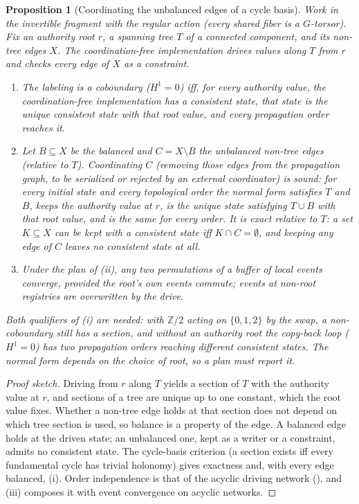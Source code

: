 \documentclass[11pt,a4paper]{article}
\theoremstyle{plain}
\newtheorem{proposition}[theorem]{Proposition}
\theoremstyle{definition}
\theoremstyle{remark}
\newcommand{\Ho}{H^1}
\renewcommand{\_}{\origunderscore\allowbreak}
\begin{document}
\begin{proposition}[Coordinating the unbalanced edges of a cycle basis]
\label{prop:minimal}
Work in the invertible fragment with the regular action (every shared fiber is a $G$-torsor). Fix an
authority root $r$, a spanning tree $T$ of a connected component, and its non-tree edges $X$. The
\emph{coordination-free implementation} drives values along $T$ from $r$ and checks every edge of $X$
as a constraint.
\begin{enumerate}[label=(\roman*)]
\item The labeling is a coboundary ($\Ho = 0$) iff, for every authority value, the coordination-free
  implementation has a consistent state, that state is the unique consistent state with that root
  value, and every propagation order reaches it.
\item Let $B \subseteq X$ be the balanced and $C = X \setminus B$ the unbalanced non-tree edges
  (relative to $T$). Coordinating $C$ (removing those edges from the propagation graph, to be
  serialized or rejected by an external coordinator) is sound: for every initial state and every
  topological order the normal form satisfies $T$ and $B$, keeps the authority value at $r$, is the
  unique state satisfying $T \cup B$ with that root value, and is the same for every order. It is
  exact relative to $T$: a set $K \subseteq X$ can be kept with a consistent state iff $K \cap C =
  \emptyset$, and keeping any edge of $C$ leaves no consistent state at all.
\item Under the plan of (ii), any two permutations of a buffer of local events converge, provided the
  root's own events commute; events at non-root registries are overwritten by the drive.
\end{enumerate}
Both qualifiers of (i) are needed: with $\mathbb{Z}/2$ acting on $\{0,1,2\}$ by the swap, a
non-coboundary still has a section, and without an authority root the copy-back loop ($\Ho = 0$) has
two propagation orders reaching different consistent states. The normal form depends on the choice
of root, so a plan must report it.
\end{proposition}
\begin{proof}[Proof sketch]
Driving from $r$ along $T$ yields a section of $T$ with the authority value at $r$, and sections of a
tree are unique up to one constant, which the root value fixes. Whether a non-tree edge holds at that
section does not depend on which tree section is used, so balance is a property of the edge. A
balanced edge holds at the driven state; an unbalanced one, kept as a writer or a constraint, admits no
consistent state. The cycle-basis criterion (a section exists iff every fundamental cycle has trivial
holonomy) gives exactness and, with every edge balanced, (i). Order independence is that of the acyclic
driving network (), and (iii) composes it with event convergence on acyclic networks.
\end{proof}
\end{document}
